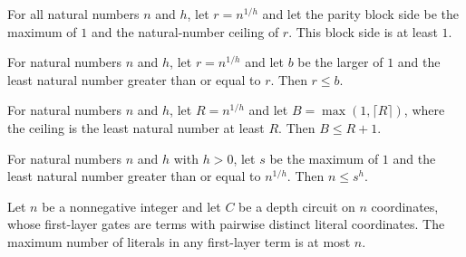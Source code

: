 \begin{theorem}
\label{FABL.one_le_parityBlockSide}
\leanok
{}
For all natural numbers $n$ and $h$, let $r=n^{1/h}$ and let the parity block side be
the maximum of $1$ and the natural-number ceiling of $r$. This block side is at least
$1$.
\end{theorem}

\begin{theorem}
\label{FABL.parityRealRoot_le_blockSide}
\leanok
{}
For natural numbers $n$ and $h$, let $r=n^{1/h}$ and let $b$ be the larger of $1$ and
the least natural number greater than or equal to $r$. Then $r\le b$.
\end{theorem}

\begin{theorem}
\label{FABL.parityBlockSide_le_root_add_one}
\leanok
{}
For natural numbers $n$ and $h$, let $R=n^{1/h}$ and let $B=\max(1,\lceil R\rceil)$,
where the ceiling is the least natural number at least $R$. Then $B\le R+1$.
\end{theorem}

\begin{theorem}
\label{FABL.parityBlockSide_pow_covers}
\leanok
{}
For natural numbers $n$ and $h$ with $h>0$, let $s$ be the maximum of $1$ and the least
natural number greater than or equal to $n^{1/h}$. Then $n\le s^h$.
\end{theorem}

\begin{theorem}
\label{FABL.DepthCircuit.width_le_dimension}
\leanok
{}
Let $n$ be a nonnegative integer and let $C$ be a depth circuit on $n$ coordinates,
whose first-layer gates are terms with pairwise distinct literal coordinates. The
maximum number of literals in any first-layer term is at most $n$.
\end{theorem}

